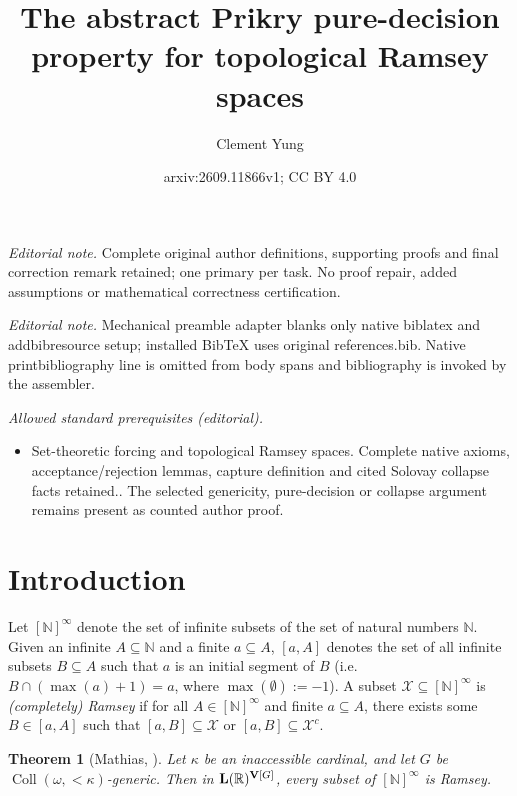 \documentclass[10pt,a4paper]{amsart}
\title{The abstract Prikry pure-decision property for topological Ramsey spaces}
\author{Clement Yung}
\date{arxiv:2609.11866v1; CC BY 4.0}
\theoremstyle{plain}
\numberwithin{equation}{section}
\newtheorem{theorem}{Theorem}[section]
\theoremstyle{definition}
\newcommand{\func}{\operatorname}
\newcommand{\R}{\mathbb{R}}
\newcommand{\N}{\mathbb{N}}
\newcommand{\cal}{\mathcal}
\renewcommand{\bf}{\mathbf}
\newcommand{\Coll}{\func{Coll}}
\newcommand{\V}{\bf{V}}
\newcommand{\X}{\cal{X}}
\DeclareRobustCommand{\L}{\ifmmode\mathbf{L}\else\strokeL\fi}
\begin{document}
\maketitle
\noindent\textit{Editorial note.} Complete original author definitions, supporting proofs and final correction remark retained; one primary per task. No proof repair, added assumptions or mathematical correctness certification.\par\medskip
\noindent\textit{Editorial note.} Mechanical preamble adapter blanks only native biblatex and addbibresource setup; installed BibTeX uses original references.bib. Native printbibliography line is omitted from body spans and bibliography is invoked by the assembler.\par\medskip
\noindent\textit{Allowed standard prerequisites (editorial).}\begin{itemize}
\item Set-theoretic forcing and topological Ramsey spaces. Complete native axioms, acceptance/rejection lemmas, capture definition and cited Solovay collapse facts retained.. The selected genericity, pure-decision or collapse argument remains present as counted author proof.
\end{itemize}\medskip
\section{Introduction}
\label{sec:intro}
Let $[\N]^\infty$ denote the set of infinite subsets of the set of natural numbers $\N$. Given an infinite $A \subseteq \N$ and a finite $a \subseteq A$, $[a,A]$ denotes the set of all infinite subsets $B \subseteq A$ such that $a$ is an initial segment of $B$ (i.e. $B \cap (\max(a) + 1) = a$, where $\max(\emptyset) := -1$). A subset $\X \subseteq [\N]^\infty$ is \emph{(completely) Ramsey} if for all $A \in [\N]^\infty$ and finite $a \subseteq A$, there exists some $B \in [a,A]$ such that $[a,B] \subseteq \X$ or $[a,B] \subseteq \X^c$. 

\begin{theorem}[Mathias, \cite{M77}]
\label{thm:Mathias}
    Let $\kappa$ be an inaccessible cardinal, and let $G$ be $\Coll(\omega,{<}\kappa)$-generic. Then in $\L(\R)^{\V[G]}$, every subset of $[\N]^\infty$ is Ramsey.
\end{theorem}
\end{document}
